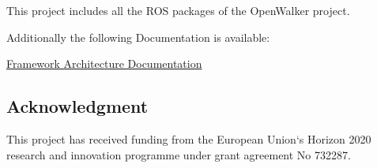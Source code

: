 This project includes all the R\+OS packages of the Open\+Walker project.

Additionally the following Documentation is available\+:
\begin{DoxyItemize}
\item \hyperlink{FrameworkArchitecturePage}{Framework Architecture Documentation}
\end{DoxyItemize}

\subsection*{Acknowledgment }

This project has received funding from the European Union‘s Horizon 2020 research and innovation programme under grant agreement No 732287. 